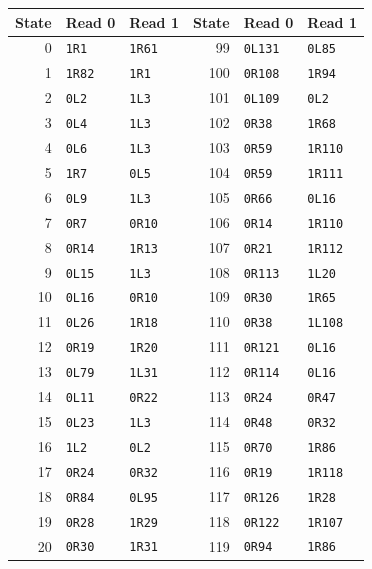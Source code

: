 \begin{longtable}{@{}r ll @{\qquad} r ll@{}}
\toprule
State & Read 0 & Read 1 & State & Read 0 & Read 1 \\
\midrule\endhead
0 & \texttt{1R1} & \texttt{1R61} & 99 & \texttt{0L131} & \texttt{0L85} \\
1 & \texttt{1R82} & \texttt{1R1} & 100 & \texttt{0R108} & \texttt{1R94} \\
2 & \texttt{0L2} & \texttt{1L3} & 101 & \texttt{0L109} & \texttt{0L2} \\
3 & \texttt{0L4} & \texttt{1L3} & 102 & \texttt{0R38} & \texttt{1R68} \\
4 & \texttt{0L6} & \texttt{1L3} & 103 & \texttt{0R59} & \texttt{1R110} \\
5 & \texttt{1R7} & \texttt{0L5} & 104 & \texttt{0R59} & \texttt{1R111} \\
6 & \texttt{0L9} & \texttt{1L3} & 105 & \texttt{0R66} & \texttt{0L16} \\
7 & \texttt{0R7} & \texttt{0R10} & 106 & \texttt{0R14} & \texttt{1R110} \\
8 & \texttt{0R14} & \texttt{1R13} & 107 & \texttt{0R21} & \texttt{1R112} \\
9 & \texttt{0L15} & \texttt{1L3} & 108 & \texttt{0R113} & \texttt{1L20} \\
10 & \texttt{0L16} & \texttt{0R10} & 109 & \texttt{0R30} & \texttt{1R65} \\
11 & \texttt{0L26} & \texttt{1R18} & 110 & \texttt{0R38} & \texttt{1L108} \\
12 & \texttt{0R19} & \texttt{1R20} & 111 & \texttt{0R121} & \texttt{0L16} \\
13 & \texttt{0L79} & \texttt{1L31} & 112 & \texttt{0R114} & \texttt{0L16} \\
14 & \texttt{0L11} & \texttt{0R22} & 113 & \texttt{0R24} & \texttt{0R47} \\
15 & \texttt{0L23} & \texttt{1L3} & 114 & \texttt{0R48} & \texttt{0R32} \\
16 & \texttt{1L2} & \texttt{0L2} & 115 & \texttt{0R70} & \texttt{1R86} \\
17 & \texttt{0R24} & \texttt{0R32} & 116 & \texttt{0R19} & \texttt{1R118} \\
18 & \texttt{0R84} & \texttt{0L95} & 117 & \texttt{0R126} & \texttt{1R28} \\
19 & \texttt{0R28} & \texttt{1R29} & 118 & \texttt{0R122} & \texttt{1R107} \\
20 & \texttt{0R30} & \texttt{1R31} & 119 & \texttt{0R94} & \texttt{1R86} \\

\end{longtable}

